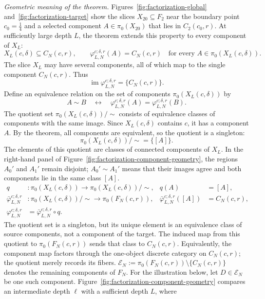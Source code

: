 \noindent\emph{Geometric meaning of the theorem.}
Figures~\ref{fig:factorization-global} and~\ref{fig:factorization-target}
show the slices \(X_{20}\subseteq F_2\) near the boundary point
\(c_0=\frac14\) and a selected component \(A\in\pi_0(X_{20})\) that
lies in \(C_2(c_0,r)\). At sufficiently large depth \(L\), the theorem
extends this property to every component of \(X_L\):
\[
 X_L(c,\delta)\subseteq C_N(c,r),\qquad
 \varphi_{L,N}^{c;\delta,r}(A)=C_N(c,r)
 \quad\text{for every }A\in\pi_0(X_L(c,\delta)).
\]
The slice \(X_L\) may have several components, all of which map to the
single component \(C_N(c,r)\). Thus
\[
 \operatorname{im}\varphi_{L,N}^{c;\delta,r}
 =\{C_N(c,r)\}.
\]
Define an equivalence relation on the set of components
\(\pi_0(X_L(c,\delta))\) by
\[
A\sim B
\quad\longleftrightarrow\quad
\varphi_{L,N}^{c;\delta,r}(A)=\varphi_{L,N}^{c;\delta,r}(B).
\]
The quotient set \(\pi_0(X_L(c,\delta))/\sim\) consists of equivalence
classes of components with the same image. Since \(X_L(c,\delta)\)
contains \(c\), it has a component \(A\). By the theorem, all
components are equivalent, so the quotient is a singleton:
\[
\pi_0(X_L(c,\delta))/\sim=\{[A]\}.
\]
The elements of this quotient are classes of connected components of
\(X_L\). In the right-hand panel of
Figure~\ref{fig:factorization-component-geometry}, the regions \(A_0'\)
and \(A_1'\) remain disjoint; \(A_0'\sim A_1'\) means that their images
agree and both components lie in the same class \([A]\).
\[
\begin{aligned}
 q &: \pi_0(X_L(c,\delta))\longrightarrow
      \pi_0(X_L(c,\delta))/\sim,
      &q(A)&=[A],\\
 \bar\varphi_{L,N}^{c;\delta,r}&:
      \pi_0(X_L(c,\delta))/\sim\longrightarrow\pi_0(F_N(c,r)),
      &\bar\varphi_{L,N}^{c;\delta,r}([A])&=C_N(c,r),\\
 \varphi_{L,N}^{c;\delta,r}&=\bar\varphi_{L,N}^{c;\delta,r}\circ q.
\end{aligned}
\]
The quotient set is a singleton, but its unique element is an
equivalence class of source components, not a component of the target.
The induced map from this quotient to \(\pi_0(F_N(c,r))\) sends that
class to \(C_N(c,r)\). Equivalently, the component map factors through
the one-object discrete category on \(C_N(c,r)\); the quotient merely
records its fibers.
\(\mathcal E_N:=\pi_0(F_N(c,r))\setminus\{C_N(c,r)\}\) denotes the
remaining components of \(F_N\). For the illustration below, let
\(D\in\mathcal E_N\) be one such component.
Figure~\ref{fig:factorization-component-geometry} compares an
intermediate depth \(\ell\) with a sufficient depth \(L\), where

